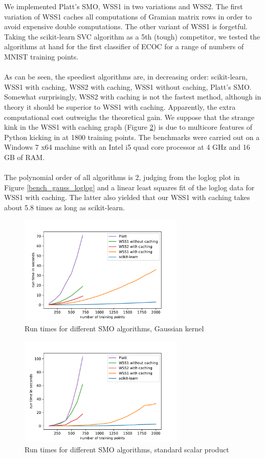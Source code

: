 We implemented Platt's SMO, WSS1 in two variations and WSS2. The first variation of WSS1 caches all computations of Gramian matrix rows in order to avoid expensive double computations. The other variant of WSS1 is forgetful. Taking the scikit-learn SVC algorithm as a 5th (tough) competitor, we tested the algorithms at hand for the first classifier of ECOC for a range of numbers of MNIST training points. \\\\
As can be seen, the speediest algorithms are, in decreasing order: scikit-learn, WSS1 with caching, WSS2 with caching, WSS1 without caching, Platt's SMO. Somewhat surprisingly, WSS2 with caching is not the fastest method, although in theory it should be superior to WSS1 with caching. Apparently, the extra computational cost outweighs the theoretical gain. We suppose that the strange kink in the WSS1 with caching graph (Figure \ref{bench_ssp}) is due to multicore features of Python kicking in at 1800 training points. The benchmarks were carried out on a Windows 7 x64 machine with an Intel i5 quad core processor at 4 GHz and 16 GB of RAM.\\\\
The polynomial order of all algorithms is 2, judging from the loglog plot in Figure \ref{bench_gauss_loglog} and a linear least squares fit of the loglog data for WSS1 with caching. The latter also yielded that our WSS1 with caching takes about 5.8 times as long as scikit-learn.

\begin{figure}[h!]
	\includegraphics[width=0.7\textwidth, center]{benchplot_gauss.pdf}
	\caption{Run times for different SMO algorithms, Gaussian kernel}
	\label{bench_gauss}
\end{figure}

\begin{figure}[h!]
	\includegraphics[width=0.7\textwidth, center]{benchplot_ssp.pdf}
	\caption{Run times for different SMO algorithms, standard scalar product}
	\label{bench_ssp}
\end{figure}

